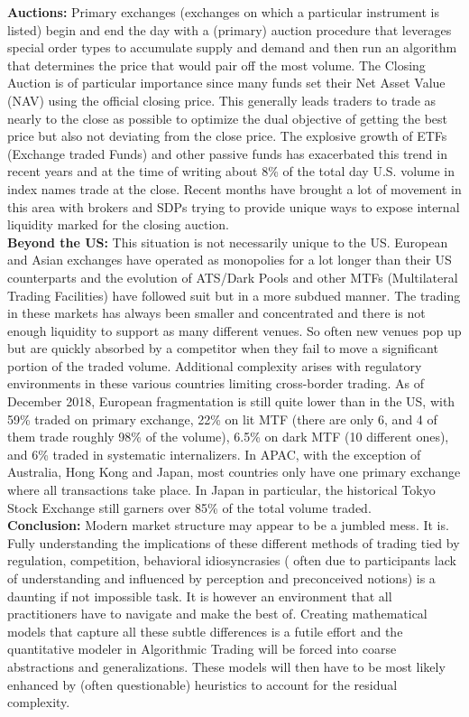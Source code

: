 \noindent\textbf{Auctions:} Primary exchanges (exchanges on which a particular instrument is listed) begin and end the day with a (primary) auction procedure that leverages special order types to accumulate supply and demand and then run an algorithm that determines the price that would pair off the most volume. The Closing Auction is of particular importance since many funds set their Net Asset Value (NAV) using the official closing price. This generally leads traders to trade as nearly to the close as possible to optimize the dual objective of getting the best price but also not deviating from the close price. The explosive growth of ETFs (Exchange traded Funds) and other passive funds has exacerbated this trend in recent years and at the time of writing about 8\% of the total day U.S. volume in index names trade at the close. Recent months have brought a lot of movement in this area with brokers and SDPs trying to provide unique ways to expose internal liquidity marked for the closing auction. \\
 
 
\noindent\textbf{Beyond the US:} This situation is not necessarily unique to the US. European and Asian exchanges have operated as monopolies for a lot longer than their US counterparts and the evolution of ATS/Dark Pools and other MTFs (Multilateral Trading Facilities) have followed suit but in a more subdued manner. The trading in these markets has always been smaller and concentrated and there is not enough liquidity to support as many different venues. So often new venues pop up but are quickly absorbed by a competitor when they fail to move a significant portion of the traded volume. Additional complexity arises with regulatory environments in these various countries limiting cross-border trading. As of December 2018, European fragmentation is still quite lower than in the US, with 59\% traded on primary exchange, 22\% on lit MTF (there are only 6, and 4 of them trade roughly 98\% of the volume), 6.5\% on dark MTF (10 different ones), and 6\% traded in systematic internalizers. In APAC, with the exception of Australia, Hong Kong and Japan, most countries only have one primary exchange where all transactions take place. In Japan in particular, the historical Tokyo Stock Exchange still garners over 85\% of the total volume traded. \\


\noindent\textbf{Conclusion:} Modern market structure may appear to be a jumbled mess. It is. Fully understanding the implications of these different methods of trading tied by regulation, competition, behavioral idiosyncrasies ( often due to participants lack of understanding and influenced by perception and preconceived notions)  is a daunting if not impossible task. It is however an environment that all practitioners have to navigate and make the best of. Creating mathematical models that capture all these subtle differences is a futile effort and the quantitative modeler in Algorithmic Trading will be forced into coarse abstractions and generalizations. These models will then have to be most likely enhanced by (often questionable) heuristics to account for the residual complexity. 


